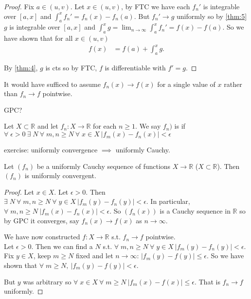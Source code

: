     \begin{proof}
        Fix $a \in (u, v)$.
        Let $x \in (u, v)$, by FTC we have each $f_n'$ is integrable over $[a, x]$ and $\int_{a}^{x} f_n' = f_n(x) - f_n(a)$.
        But $f_n' \to g$ uniformly so by \cref{thm:5} $g$ is integrable over $[a, x]$ and $\int_{a}^{x} g = \lim_{n \to \infty} \int_{a}^{x} f_n' = f(x) - f(a)$.
        So we have shown that for all $x \in (u, v)$
        \begin{align*}
            f(x) &= f(a) + \int_a^x g.
        \end{align*} 

        By \cref{thm:4}, $g$ is cts so by FTC, $f$ is differentiable with $f' = g$.
    \end{proof} 

    \begin{remark}
        It would have sufficed to assume $f_n(x) \to f(x)$ for a single value of $x$ rather than $f_n \to f$ pointwise.
    \end{remark} 

    GPC?

    \begin{definition}
        Let $X \subset \mathbb{R}$ and let $f_n : X \to \mathbb{R}$ for each $n \geq 1$.
        We say $f_n)$ is  if $\forall \; \epsilon > 0 \ \exists \; N \ \forall \; m, n \geq N \ \forall \; x \in X \ |f_m(x) - f_n(x)| < \epsilon$
    \end{definition} 

    exercise: uniformly convergence $\implies$ uniformly Cauchy.

    \begin{theorem} \label{thm:7}
        Let $(f_n)$ be a uniformly Cauchy sequence of functions $X \to \mathbb{R}$ ($X \subset \mathbb{R}$).
        Then $(f_n)$ is uniformly convergent.
    \end{theorem} 

    \begin{proof}
        Let $x \in X$.
        Let $\epsilon > 0$.
        Then $\exists \; N \ \forall \; m,n \geq N \ \forall \; y \in X \ |f_m(y) - f_n(y)| < \epsilon$.
        In particular, $\forall \; m, n \geq N \ |f_m(x) - f_n(x)| < \epsilon$.
        So $(f_n(x))$ is a Cauchy sequence in $\mathbb{R}$ so by GPC it converges, say $f_n(x) \to f(x)$ as $n \to \infty$. 

        We have now constructed $f : X \to \mathbb{R}$ s.t. $f_n \to f$ pointwise. \\
        Let $\epsilon > 0$.
        Then we can find a $N$ s.t. $\forall \; m, n \geq N \ \forall \; y \in X \ |f_m(y) - f_n(y)| < \epsilon$.
        Fix $y \in X$, keep $m \geq N$ fixed and let $n \to \infty$: $|f_m(y) - f(y)| \leq \epsilon$.
        So we have shown that $\forall \; m \geq N,\ |f_m(y) - f(y)| < \epsilon$.

        But $y$ was arbitrary so $\forall \; x \in X \ \forall \; m \geq N \ |f_m(x) - f(x)| \leq \epsilon$.
        That is $f_n \to f$ uniformly.
    \end{proof} 

